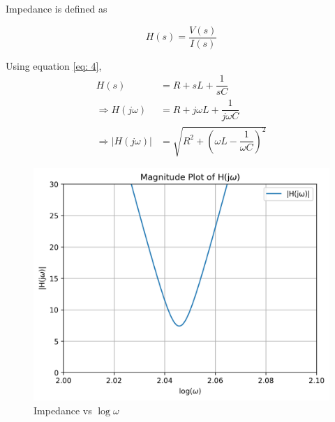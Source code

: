 \documentclass[journal,12pt,twocolumn]{IEEEtran}
\theoremstyle{remark}
\begin{document}
\begin{enumerate}
Impedance is defined as

\begin{equation}
    H(s) = \dfrac{V(s)}{I(s)}
\end{equation}

Using equation \eqref{eq: 4},
\begin{align}
     H(s) &= R + sL + \dfrac{1}{sC}\\
     \Rightarrow H(j\omega) &= R + j\omega L + \dfrac{1}{j\omega C}\\
     \Rightarrow \lvert H(j\omega) \rvert &= \sqrt{R^2 + \left(\omega L - \dfrac{1}{\omega C}\right)^2}
\end{align}

\begin{figure}[h]
    \centering
    \includegraphics[width = 2.4 in, height = 1.6 in]{figs/h_plot.png}
    \caption{Impedance vs $\log\omega$}
    \label{fig:h_plot}
\end{figure}

\end{enumerate}
\renewcommand{\thefigure}{\theenumi}
\renewcommand{\thetable}{\theenumi}
\end{document}
